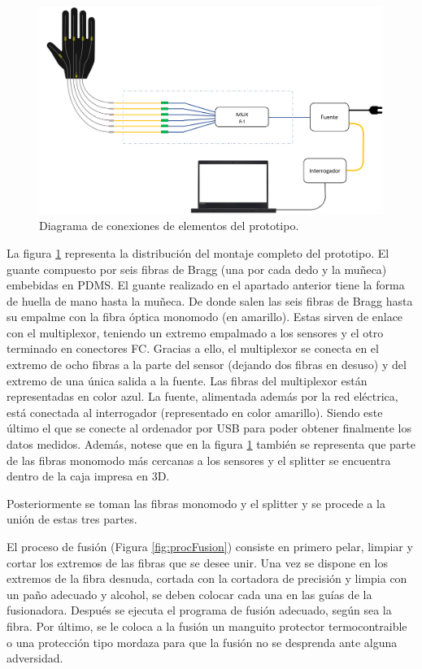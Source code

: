 \begin{itemize}
	\begin{figure}[H]
		\centering
		\includegraphics[width=1\textwidth]{./img/diagramaFBG}
		\caption{Diagrama de conexiones de elementos del prototipo.} \label{fig:diagramaFBG}
	\end{figure}
	
	La figura \ref{fig:diagramaFBG} representa la distribución del montaje completo del prototipo. El guante compuesto por seis fibras de Bragg (una por cada dedo y la muñeca) embebidas en PDMS. El guante realizado en el apartado anterior tiene la forma de huella de mano hasta la muñeca. De donde salen las seis fibras de Bragg hasta su empalme con la fibra óptica monomodo (en amarillo). Estas sirven de enlace con el multiplexor, teniendo un extremo empalmado a los sensores y el otro terminado en conectores FC. Gracias a ello, el multiplexor se conecta en el extremo de ocho fibras a la parte del sensor (dejando dos fibras en desuso) y del extremo de una única salida a la fuente. Las fibras del multiplexor están representadas en color azul. La fuente, alimentada además por la red eléctrica, está conectada al interrogador (representado en color amarillo). Siendo este último el que se conecte al ordenador por USB para poder obtener finalmente los datos medidos. Además, notese que en la figura \ref{fig:diagramaFBG} también se representa que parte de las fibras monomodo más cercanas a los sensores y el splitter se encuentra dentro de la caja impresa en 3D. 
	
			\clearpage
	
	 
	Posteriormente se toman las fibras monomodo y el splitter y se procede a la unión de estas tres partes. 
	
	El proceso de fusión (Figura \ref{fig:procFusion}) consiste en primero pelar, limpiar y cortar los extremos de las fibras que se desee unir. Una vez se dispone en los extremos de la fibra desnuda, cortada con la cortadora de precisión y limpia con un paño adecuado y alcohol, se deben colocar cada una en las guías de la fusionadora. Después se ejecuta el programa de fusión adecuado, según sea la fibra. Por último, se le coloca a la fusión un manguito protector termocontraible o una protección tipo mordaza para que la fusión no se desprenda ante alguna adversidad. 
	

\end{itemize}
